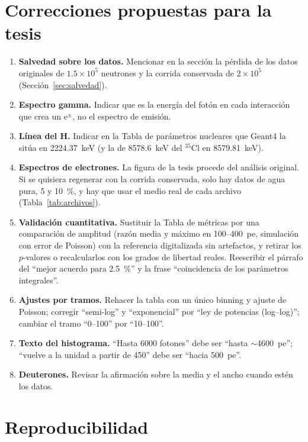 \documentclass[11pt,a4paper]{article}
\begin{document}
\section{Correcciones propuestas para la tesis}

\begin{enumerate}
  \item \textbf{Salvedad sobre los datos.} Mencionar en la sección la pérdida de los datos originales de $1.5\times10^5$ neutrones y la corrida conservada de $2\times10^5$ (Sección~\ref{sec:salvedad}).
  \item \textbf{Espectro gamma.} Indicar que es la energía del fotón en cada interacción que crea un e$^\pm$, no el espectro de emisión.
  \item \textbf{Línea del H.} Indicar en la Tabla de parámetros nucleares que Geant4 la sitúa en 2224.37~keV (y la de 8578.6~keV del $^{35}$Cl en 8579.81~keV).
  \item \textbf{Espectros de electrones.} La figura de la tesis procede del análisis original. Si se quisiera regenerar con la corrida conservada, solo hay datos de agua pura, 5 y 10~\%, y hay que usar el medio real de cada archivo (Tabla~\ref{tab:archivos}).
  \item \textbf{Validación cuantitativa.} Sustituir la Tabla de métricas por una comparación de amplitud (razón media y máximo en 100--400~pe, simulación con error de Poisson) con la referencia digitalizada sin artefactos, y retirar los $p$-valores o recalcularlos con los grados de libertad reales. Reescribir el párrafo del ``mejor acuerdo para 2.5~\%'' y la frase ``coincidencia de los parámetros integrales''.
  \item \textbf{Ajustes por tramos.} Rehacer la tabla con un único binning y ajuste de Poisson; corregir ``semi-log'' y ``exponencial'' por ``ley de potencias (log--log)''; cambiar el tramo ``0--100'' por ``10--100''.
  \item \textbf{Texto del histograma.} ``Hasta 6000 fotones'' debe ser ``hasta $\sim$4600~pe''; ``vuelve a la unidad a partir de 450'' debe ser ``hacia 500~pe''.
  \item \textbf{Deuterones.} Revisar la afirmación sobre la media y el ancho cuando estén los datos.
\end{enumerate}

\section{Reproducibilidad}
\end{document}

